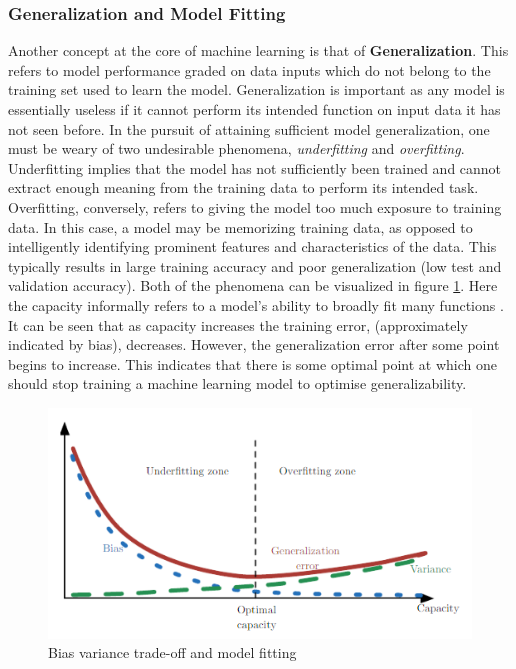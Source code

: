 \subsubsection{Generalization and Model Fitting}
Another concept at the core of machine learning is that of \textbf{Generalization}. This refers to model performance graded on data inputs which do not belong to the training set used to learn the model. Generalization is important as any model is essentially useless if it cannot perform its intended function on input data it has not seen before. In the pursuit of attaining sufficient model generalization, one must be weary of two undesirable phenomena, \textit{underfitting} and \textit{overfitting}. Underfitting implies that the model has not sufficiently been trained and cannot extract enough meaning from the training data to perform its intended task. Overfitting, conversely, refers to giving the model too much exposure to training data. In this case, a model may be memorizing training data, as opposed to intelligently identifying prominent features and characteristics of the data. This typically results in large training accuracy and poor generalization (low test and validation accuracy). Both of the phenomena can be visualized in figure \ref{biasVarTrade}. Here the capacity informally refers to a model's ability to broadly fit many functions \cite{Goodfellow-et-al-2016}. It can be seen that as capacity increases the training error, (approximately indicated by bias), decreases. However, the generalization error after some point begins to increase. This indicates that there is some optimal point at which one should stop training a machine learning model to optimise generalizability.
\begin{figure}
    \centering
    \includegraphics[scale = 1.0]{images/BiasVarTradeOff_Fig.png}
    \caption{Bias variance trade-off and model fitting \cite{Goodfellow-et-al-2016}}
    \label{biasVarTrade}
\end{figure}

